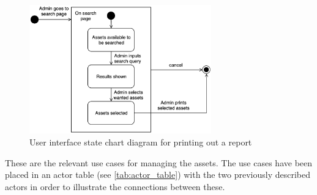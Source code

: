 \begin{figure}[H]
    \centering
    \includegraphics[width=0.70\textwidth]{figures/UseCases/UC_Print_report.png}
    \caption{User interface state chart diagram for printing out a report}
    \label{fig:print_report_statechart}
\end{figure}

These are the relevant use cases for managing the assets. The use cases have been placed in an actor table (see \autoref{tab:actor_table}) with the two previously described actors in order to illustrate the connections between these.

